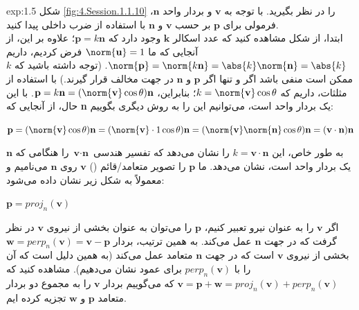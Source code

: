 {\begin{spacing}{1.5}
        \textbf{\vspace{-20pt}}
        \begin{example}{exp:1.5}
            شکل \ref{fig:4.Session.1.1.10} را در نظر بگیرید.
            با توجه به $\textbf{v}$ و بردار واحد $\textbf{n}$، فرمولی برای $\textbf{p}$ بر حسب $\textbf{v}$ و $\textbf{n}$ با استفاده از ضرب داخلی پیدا کنید. \\
            ابتدا، از شکل مشاهده کنید که عدد اسکالر $\textbf{k}$ وجود دارد
            که $\textbf{p}=k\textbf{n}$؛ علاوه بر این، از آنجایی که ما $\norm{\textbf{u}}=1$ فرض کردیم،
            داریم $\norm{\textbf{p}}=\norm{k\textbf{n}}=\abs{k}\norm{\textbf{n}}=\abs{k}$.
            (توجه داشته باشید که $k$ ممکن است منفی باشد اگر و تنها اگر $\textbf{p}$ و $\textbf{n}$ در جهت مخالف قرار گیرند.)
            با استفاده از مثلثات، داریم که $k=\norm{\textbf{v}}\cos\theta$؛
            بنابراین، $\textbf{p}=k\textbf{n}=(\norm{\textbf{v}}\cos\theta)\textbf{n}$.
            با این حال، از آنجایی که \textbf{n} یک بردار واحد است، می‌توانیم این را به روش دیگری بگوییم:

            \begin{center}
                $\textbf{p}=(\norm{\textbf{v}}\cos\theta)\textbf{n}=(\norm{\textbf{v}}\cdot 1\cos\theta)\textbf{n}=(\norm{\textbf{v}}\norm{\textbf{n}}\cos\theta)\textbf{n}=(\textbf{v}\cdot\textbf{n})\textbf{n}$
            \end{center}

            به طور خاص، این $k=\textbf{v}\cdot\textbf{n}$ را نشان می‌دهد که تفسیر هندسی $\textbf{v}\cdot\textbf{n}$ را هنگامی که $\textbf{n}$ یک بردار واحد است، نشان می‌دهد. ما $\textbf{p}$ را تصویر متعامد/قائم () $\textbf{v}$ روی $\textbf{n}$ می‌نامیم و معمولاً به شکل زیر نشان داده می‌شود:

            \begin{center}
                $\textbf{p}=proj_{n}(\textbf{v})$
            \end{center}

            اگر $\textbf{v}$ را به عنوان نیرو تعبیر کنیم، $\textbf{p}$ را می‌توان به عنوان بخشی از نیروی $\textbf{v}$ در نظر گرفت که در جهت $\textbf{n}$ عمل می‌کند.
            به همین ترتیب، بردار $\textbf{w}=perp_{n}(\textbf{v})=\textbf{v}-\textbf{p}$ بخشی از نیروی $\textbf{v}$ است که در جهت $\textbf{n}$ متعامد عمل می‌کند
            (به همین دلیل است که آن را با $perp_{n}(\textbf{v})$ برای عمود نشان می‌دهیم).
            مشاهده کنید که $\textbf{v}=\textbf{p}+\textbf{w}=proj_{n}(\textbf{v})+perp_{n}(\textbf{v})$ که می‌گوییم بردار $\textbf{v}$ را به مجموع دو بردار متعامد $\textbf{p}$ و $\textbf{w}$ تجزیه کرده ایم.


\end{example}
\end{spacing}}
